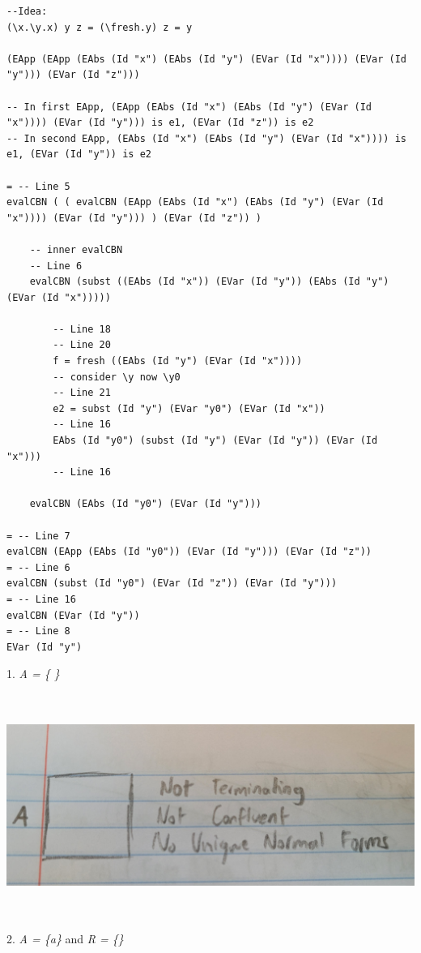 \documentclass{article}
\theoremstyle{theorem}
\theoremstyle{definition}
\theoremstyle{remark}
\begin{document}
\begin{lstlisting}
--Idea:
(\x.\y.x) y z = (\fresh.y) z = y

(EApp (EApp (EAbs (Id "x") (EAbs (Id "y") (EVar (Id "x")))) (EVar (Id "y"))) (EVar (Id "z")))

-- In first EApp, (EApp (EAbs (Id "x") (EAbs (Id "y") (EVar (Id "x")))) (EVar (Id "y"))) is e1, (EVar (Id "z")) is e2
-- In second EApp, (EAbs (Id "x") (EAbs (Id "y") (EVar (Id "x")))) is e1, (EVar (Id "y")) is e2

= -- Line 5
evalCBN ( ( evalCBN (EApp (EAbs (Id "x") (EAbs (Id "y") (EVar (Id "x")))) (EVar (Id "y"))) ) (EVar (Id "z")) )

    -- inner evalCBN
    -- Line 6
    evalCBN (subst ((EAbs (Id "x")) (EVar (Id "y")) (EAbs (Id "y") (EVar (Id "x")))))
    
        -- Line 18
        -- Line 20
        f = fresh ((EAbs (Id "y") (EVar (Id "x"))))
        -- consider \y now \y0
        -- Line 21
        e2 = subst (Id "y") (EVar "y0") (EVar (Id "x"))
        -- Line 16
        EAbs (Id "y0") (subst (Id "y") (EVar (Id "y")) (EVar (Id "x")))
        -- Line 16
        
    evalCBN (EAbs (Id "y0") (EVar (Id "y")))
    
= -- Line 7
evalCBN (EApp (EAbs (Id "y0")) (EVar (Id "y"))) (EVar (Id "z"))
= -- Line 6
evalCBN (subst (Id "y0") (EVar (Id "z")) (EVar (Id "y")))
= -- Line 16
evalCBN (EVar (Id "y"))
= -- Line 8
EVar (Id "y")
\end{lstlisting}
1. \textit{A = \{ \}}
\\ \includegraphics[width=15cm, height=8cm]{Report Images/week7_1.jpg}
\\2. \textit{A = \{a\}} and \textit{R = \{\}}
\end{document}
